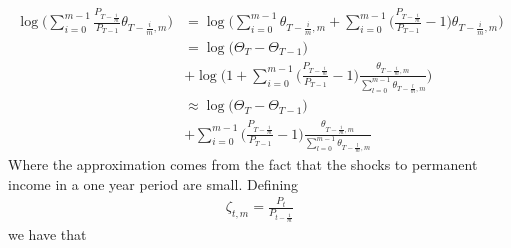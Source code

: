 \begin{align*}
\log \Bigg(\sum_{i=0}^{m-1} \frac{P_{T-\frac{i}{m}}}{P_{T-1}} \theta_{T-\frac{i}{m},m} \Bigg)
&= \log \Bigg(\sum_{i=0}^{m-1} \theta_{T-\frac{i}{m},m} + \sum_{i=0}^{m-1} \Big(\frac{P_{T-\frac{i}{m}}}{P_{T-1}}-1\Big) \theta_{T-\frac{i}{m},m} \Bigg) \\
&= \log\Big( \Theta_T-\Theta_{T-1}\Big) \\
&+ \log \Bigg(1 + \sum_{i=0}^{m-1} \Big(\frac{P_{T-\frac{i}{m}}}{P_{T-1}}-1\Big) \frac{\theta_{T-\frac{i}{m},m}}{\sum_{l=0}^{m-1} \theta_{T-\frac{l}{m},m}} \Bigg) \\
&\approx \log\Big( \Theta_T-\Theta_{T-1}\Big) \\
& +  \sum_{i=0}^{m-1} \Big(\frac{P_{T-\frac{i}{m}}}{P_{T-1}}-1\Big) \frac{\theta_{T-\frac{i}{m},m}}{\sum_{l=0}^{m-1} \theta_{T-\frac{l}{m},m}}
\end{align*}
Where the approximation comes from the fact that the shocks to permanent income in a one year period are small. Defining
\begin{align*}
\zeta_{t,m} = \frac{P_{t}}{P_{t-\frac{1}{m}}}
\end{align*}
we have that
